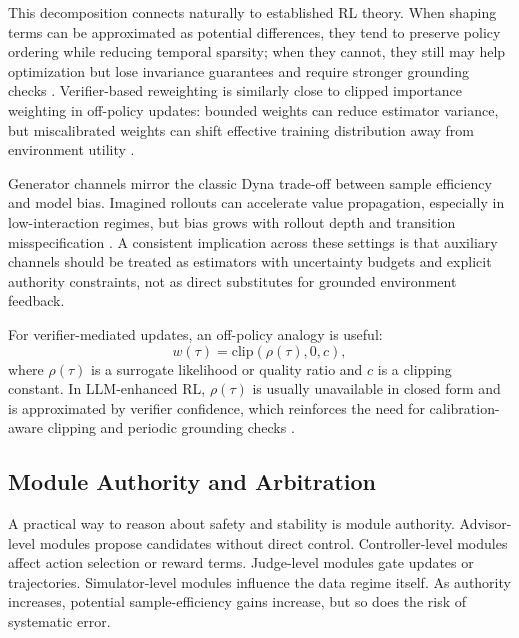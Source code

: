 ﻿\documentclass[conference]{IEEEtran}
\begin{document}
This decomposition connects naturally to established RL theory. When shaping terms can be approximated as potential differences, they tend to preserve policy ordering while reducing temporal sparsity; when they cannot, they still may help optimization but lose invariance guarantees and require stronger grounding checks \cite{arxiv_p_2310_12931,arxiv_p_2309_11489,arxiv_p_2309_06687}. Verifier-based reweighting is similarly close to clipped importance weighting in off-policy updates: bounded weights can reduce estimator variance, but miscalibrated weights can shift effective training distribution away from environment utility \cite{arxiv_p_2602_06493,arxiv_p_2602_12579,arxiv_p_2602_02395}.

Generator channels mirror the classic Dyna trade-off between sample efficiency and model bias. Imagined rollouts can accelerate value propagation, especially in low-interaction regimes, but bias grows with rollout depth and transition misspecification \cite{arxiv_p_2301_12050,arxiv_p_2602_02454,arxiv_p_2602_11075,arxiv_p_2602_12099}. A consistent implication across these settings is that auxiliary channels should be treated as estimators with uncertainty budgets and explicit authority constraints, not as direct substitutes for grounded environment feedback.

For verifier-mediated updates, an off-policy analogy is useful:
\begin{equation}
w(\tau)=\mathrm{clip}\!\left(\rho(\tau),0,c\right),
\label{eq:clip_importance}
\end{equation}
where $\rho(\tau)$ is a surrogate likelihood or quality ratio and $c$ is a clipping constant. In LLM-enhanced RL, $\rho(\tau)$ is usually unavailable in closed form and is approximated by verifier confidence, which reinforces the need for calibration-aware clipping and periodic grounding checks \cite{arxiv_p_2602_06493,arxiv_p_2602_12579,arxiv_p_2508_03680}.

\subsection{Module Authority and Arbitration}
A practical way to reason about safety and stability is module authority. Advisor-level modules propose candidates without direct control. Controller-level modules affect action selection or reward terms. Judge-level modules gate updates or trajectories. Simulator-level modules influence the data regime itself. As authority increases, potential sample-efficiency gains increase, but so does the risk of systematic error.
\end{document}
